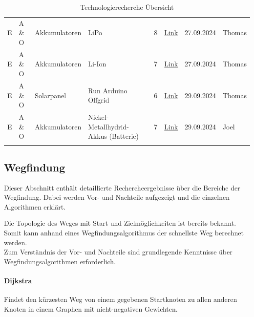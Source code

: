 \documentclass[../main.tex]{subfiles}
\begin{document}
\begin{longtable}{lp{2cm}p{2cm}p{4cm}clcl}
\tabularnewline
E & A \& O & Akkumulatoren & LiPo & 8 & \href{https://www.lion-care.com/lipo-akkus-eigenschaften-vorteile-und-mehr}{Link} & 27.09.2024 & Thomas
\tabularnewline
E & A \& O & Akkumulatoren & Li-Ion & 7 & \href{https://poleenergy.ch/shop_content.php?coID=32}{Link} & 27.09.2024 & Thomas
\tabularnewline
E & A \& O & Solarpanel & Run Arduino Offgrid & 6 & \href{https://voltaicsystems.com/solar-arduino-guide/}{Link} & 29.09.2024 & Thomas
\tabularnewline
E & A \& O & Akkumulatoren & Nickel-Metallhydrid-Akkus \newline (Batterie) & 7 & \href{https://www.chemie.de/lexikon/Nickel-Metallhydrid-Akkumulator.html}{Link} & 29.09.2024 & Joel
\tabularnewline
\caption{Technologierecherche Übersicht}
\label{tab:technologierecherche}
\end{longtable}
\normalsize




\newpage
\subsection{Wegfindung}
\label{a2:Wegfindung}

Dieser Abschnitt enthält detaillierte Rechercheergebnisse über die Bereiche der Wegfindung. Dabei werden Vor- und Nachteile aufgezeigt und die einzelnen Algorithmen erklärt.

Die Topologie des Weges mit Start und Zielmöglichkeiten ist bereits bekannt.
Somit kann anhand eines Wegfindungsalgorithmus der schnellste Weg berechnet werden. \\ 

Zum Verständnis der Vor- und Nachteile sind grundlegende Kenntnisse über Wegfindungsalgorithmen erforderlich.

\paragraph{Dijkstra}

Findet den kürzesten Weg von einem gegebenen Startknoten zu allen anderen Knoten in einem Graphen mit nicht-negativen Gewichten.
\end{document}
